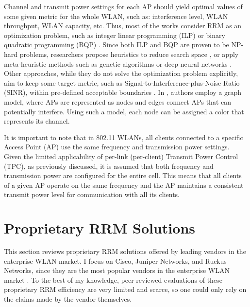 Channel and transmit power settings for each AP should yield optimal values of some given metric for the whole WLAN, such as: interference level, WLAN throughput, WLAN capacity, etc. Thus, most of the works consider RRM as an optimization problem, such as integer linear programming (ILP) \cite{leeOptimizationAPPlacement2002} \cite{rodriguesDesignCapacityPlanning2000} or binary quadratic programming (BQP) \cite{leeDeepLearningAidedChannel2023}.
Since both ILP and BQP are proven to be NP-hard problems, researchers propose heuristics to reduce search space \cite{levantiCAPWAPCompliantSolutionRadio2007}, or apply meta-heuristic methods such as genetic algorithms \cite{raschellaEvaluationChannelAssignment2019} or deep neural networks \cite{leeDeepLearningAidedChannel2023}. Other approaches, while they do not solve the optimization problem explicitly, aim to keep some target metric, such as Signal-to-Interference-plus-Noise Ratio (SINR), within pre-defined acceptable boundaries \cite{michalskiSimplePerformanceboostingAlgorithm2016}.
In \cite{aruneshmishraWeightedColoringBased2005}, authors employ a graph model, where APs are represented as nodes and edges connect APs that can potentially interfere. Using such a model, each node can be assigned a color that represents its channel.

It is important to note that in 802.11 WLANs, all clients connected to a specific Access Point (AP) use the same frequency and transmission power settings. Given the limited applicability of per-link (per-client) Transmit Power Control (TPC), as previously discussed, it is assumed that both frequency and transmission power are configured for the entire cell. This means that all clients of a given AP operate on the same frequency and the AP maintains a consistent transmit power level for communication with all its clients.


\section {Proprietary RRM Solutions}
\label{chap:lr:sec:prop_rrm}
This section reviews proprietary RRM solutions offered by leading vendors in the enterprise WLAN market. I focus on Cisco, Juniper Networks, and Ruckus Networks, since they are the most popular vendors in the enterprise WLAN market \cite{WiFiMarketSize}. To the best of my knowledge, peer-reviewed evaluations of these proprietary RRM efficiency are very limited and scarce, so one could only rely on the claims made by the vendor themselves.

